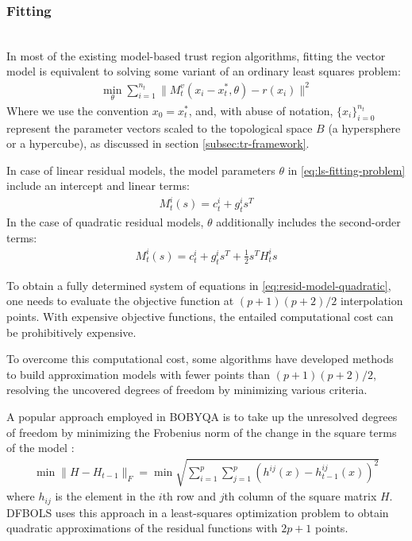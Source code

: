 \subsubsection{Fitting}
\label{subsubsec:fitting}
\hfill\\


In most of the existing model-based trust region algorithms, fitting the vector model is equivalent to solving some variant of an ordinary least squares problem:
\begin{align}
    \min\limits_{\theta}\sum\limits_{i=1}^{n_t}\lVert M_t^v(x_i-x_t^*,\theta)-r(x_i)\rVert^2
    \label{eq:ls-fitting-problem}
\end{align}
Where we use the convention $x_0=x_t^*$, and, with abuse of notation, $\{x_i\}_{i=0}^{n_t}$ represent the parameter vectors scaled to the topological space $B$ (a hypersphere or a hypercube), as discussed in section \ref{subsec:tr-framework}.

In case of linear residual models, the model parameters $\theta$ in \ref{eq:ls-fitting-problem} include an intercept and linear terms:
\begin{align}
    M_t^i(s)= c^i_t+g_t^is^T
    \label{eq:resid-model-linear}
\end{align}
In the case of quadratic residual models, $\theta$ additionally includes the second-order terms:
\begin{align}
    M_t^i(s)= c^i_t+g_t^is^T+\frac{1}{2}s^TH_t^is
    \label{eq:resid-model-quadratic}
\end{align}

To obtain a fully determined system of equations in \ref{eq:resid-model-quadratic}, one needs to evaluate the objective function at $(p+1)(p+2)/2$ interpolation points. With expensive objective functions, the entailed computational cost can be prohibitively expensive.

To overcome this computational cost, some algorithms have developed methods to build approximation models with fewer points than  $(p+1)(p+2)/2$, resolving the uncovered degrees of freedom by minimizing various criteria.

A popular approach employed in BOBYQA is to take up the unresolved degrees of freedom by minimizing the Frobenius norm of the change in the square terms of the model \citep{Powell2003}:
\begin{align}
    \min\lVert H-H_{t-1}\rVert_F = \min\sqrt{\sum\limits_{i=1}^p\sum\limits_{j=1}^{p}(h^{ij}(x)-h^{ij}_{t-1}(x))^2}
    \label{eq:min-frob-diff}
\end{align}
where $h_{ij}$ is the element in the $i$th row and $j$th column of the square matrix $H$. DFBOLS \citep{Zhang2010} uses this approach in a least-squares optimization problem to obtain quadratic approximations of the residual functions with $2p+1$ points.


